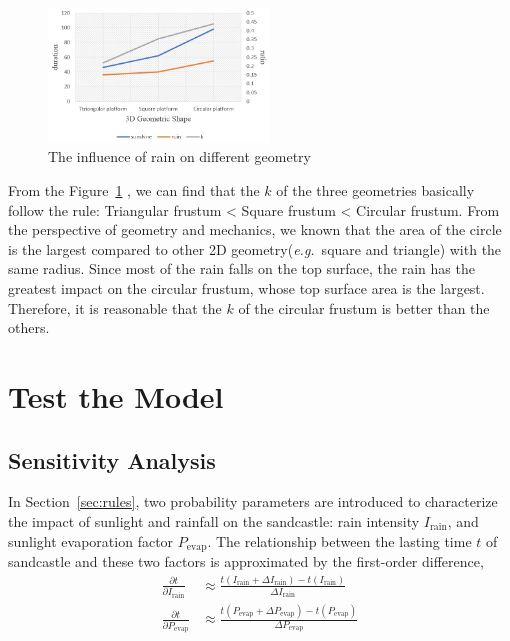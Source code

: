 \documentclass{mcmthesis}		    %
\def\eg{\mbox{\textit{e.g.}}}
\begin{document}
\begin{figure}[htbp!]
{\begin{minipage}[t]{0.32\linewidth}
			\centering
			\includegraphics[width=2.3in,height=0.8\linewidth]{B=10.jpg}
		\end{minipage}%
	}%
	\caption{The influence of rain on different geometry }\label{fig:The influence of rain on different geometry}
\end{figure}

    From the Figure~\ref{fig:The influence of rain on different geometry}
	, we can find that the $k$ of the three geometries basically follow the rule: Triangular frustum < Square frustum < Circular frustum. From the perspective of geometry and mechanics, we known that the area of the circle is the largest compared to other 2D geometry(\eg~square and triangle) with the same radius. Since most of the rain falls on the top surface, the rain has the greatest impact on the circular frustum, whose top surface area is the largest. Therefore, it is reasonable that the $k$ of the circular frustum is better than the others.
	

	\section{Test the Model}
	\subsection{Sensitivity Analysis}
	In Section~\ref{sec:rules}, two probability parameters are introduced to characterize the impact of sunlight and rainfall on the sandcastle: rain intensity $I_{\text{rain}}$, and sunlight evaporation factor $P_{\text{evap}}$. The relationship between the lasting time $t$ of sandcastle and these two factors is approximated by the first-order difference,
	\begin{equation}
	\begin{split}
	\frac{\partial t}{\partial I_{\text{rain}}} &\approx \frac{t(I_{\text{rain}}+\Delta I_{\text{rain}})-t(I_{\text{rain}})}{\Delta I_{\text{rain}}}\\
	\frac{\partial t}{\partial P_{\text{evap}}} &\approx \frac{t(P_{\text{evap}}+\Delta P_{\text{evap}})-t(P_{\text{evap}})}{\Delta P_{\text{evap}}}
	\end{split}
	\end{equation}
	
\end{document}
